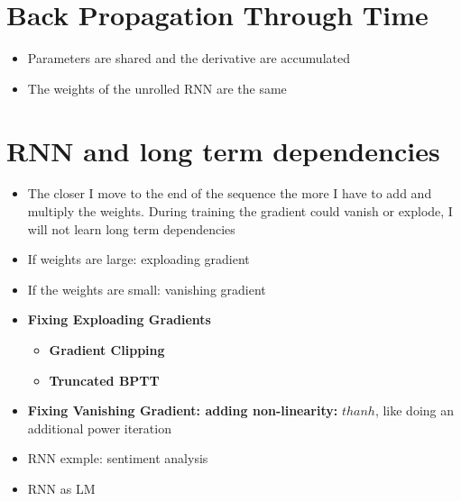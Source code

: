 \section{Back Propagation Through Time}
\begin{itemize}
    \item Parameters are shared and the derivative are accumulated
    \item The weights of the unrolled RNN are the same
\end{itemize}
\section{RNN and long term dependencies}
\begin{itemize}
    \item The closer I move to the end of the sequence the more I have to add and multiply the weights. During training the gradient could vanish or explode, I will not learn long term dependencies
    \item If weights are large: exploading gradient
    \item If the weights are small: vanishing gradient
    \item \textbf{Fixing Exploading Gradients}
    \begin{itemize}
        \item \textbf{Gradient Clipping}
        \item \textbf{Truncated BPTT}
    \end{itemize}
    \item \textbf{Fixing Vanishing Gradient: adding non-linearity:} \(thanh\), like doing an additional power iteration
    \item RNN exmple: sentiment analysis
    \item RNN as LM
\end{itemize}

